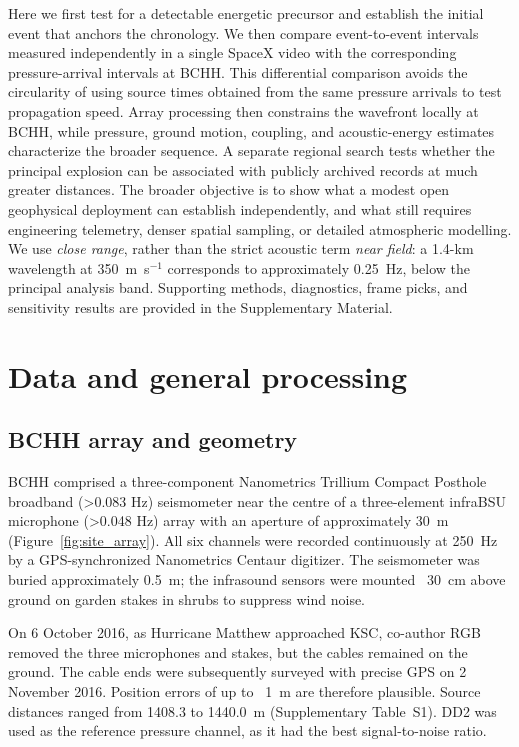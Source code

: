 \documentclass[]{seismica}
\begin{document}
Here we first test for a detectable energetic precursor and establish the
initial event that anchors the chronology. We then compare event-to-event
intervals measured independently in a single SpaceX video with the corresponding
pressure-arrival intervals at BCHH. This differential comparison avoids the
circularity of using source times obtained from the same pressure arrivals to
test propagation speed. Array processing then constrains the wavefront locally
at BCHH, while pressure, ground motion, coupling, and acoustic-energy estimates
characterize the broader sequence. A separate regional search tests whether the
principal explosion can be associated with publicly archived records at much
greater distances. The broader objective is to show what a modest open
geophysical deployment can establish independently, and what still requires
engineering telemetry, denser spatial sampling, or detailed atmospheric
modelling. We use \emph{close range}, rather than the strict acoustic term
\emph{near field}: a 1.4-km wavelength at 350~m~s$^{-1}$ corresponds to
approximately 0.25~Hz, below the principal analysis band. Supporting methods,
diagnostics, frame picks, and sensitivity results are provided in the
Supplementary Material.


\section{Data and general processing}
\label{sec:data}

\subsection{BCHH array and geometry}

BCHH comprised a three-component Nanometrics Trillium Compact Posthole
broadband (>0.083 Hz) seismometer near the centre of a three-element 
infraBSU microphone (>0.048 Hz) array with an aperture of approximately 
30~m (Figure~\ref{fig:site_array}). All six channels were recorded 
continuously at 250~Hz by a GPS-synchronized Nanometrics Centaur 
digitizer. The seismometer was buried approximately 0.5~m; the infrasound 
sensors were mounted ~30~cm above ground on garden stakes in shrubs to 
suppress wind noise.

On 6 October 2016, as Hurricane Matthew approached KSC, co-author RGB 
removed the three microphones and stakes, but the cables remained on 
the ground. The cable ends were subsequently surveyed with precise GPS on
2 November 2016. Position errors of up to ~1~m are therefore plausible.
Source distances ranged from 1408.3 to 1440.0~m
(Supplementary Table~S1). DD2 was used as the reference
pressure channel, as it had the best signal-to-noise ratio.
\end{document}
